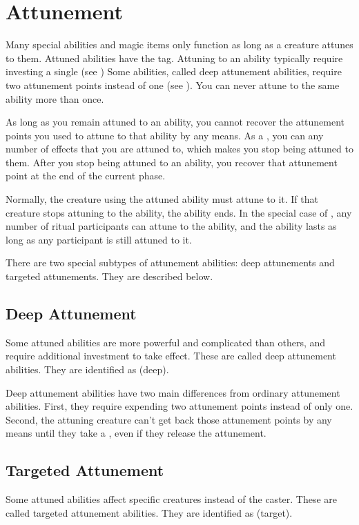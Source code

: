 \section{Attunement}\label{Attunement}
    Many special abilities and magic items only function as long as a creature attunes to them.
    Attuned abilities have the  tag.
    Attuning to an ability typically require investing a single  (see )
    Some abilities, called deep attunement abilities, require two attunement points instead of one (see ).
    You can never attune to the same ability more than once.

    As long as you remain attuned to an ability, you cannot recover the attunement points you used to attune to that ability by any means.
    As a , you can  any number of effects that you are attuned to, which makes you stop being attuned to them.
    After you stop being attuned to an ability, you recover that attunement point at the end of the current phase.

    Normally, the creature using the attuned ability must attune to it.
    If that creature stops attuning to the ability, the ability ends.
    In the special case of , any number of ritual participants can attune to the ability, and the ability lasts as long as any participant is still attuned to it.

    There are two special subtypes of attunement abilities: deep attunements and targeted attunements.
    They are described below.

    \subsection{Deep Attunement}\label{Deep Attunement}
        Some attuned abilities are more powerful and complicated than others, and require additional investment to take effect.
        These are called deep attunement abilities.
        They are identified as  (deep).

        Deep attunement abilities have two main differences from ordinary attunement abilities.
        First, they require expending two attunement points instead of only one.
        Second, the attuning creature can't get back those attunement points by any means until they take a , even if they release the attunement.

    \subsection{Targeted Attunement}\label{Targeted Attunement}
        Some attuned abilities affect specific creatures instead of the caster.
        These are called targeted attunement abilities.
        They are identified as  (target).

